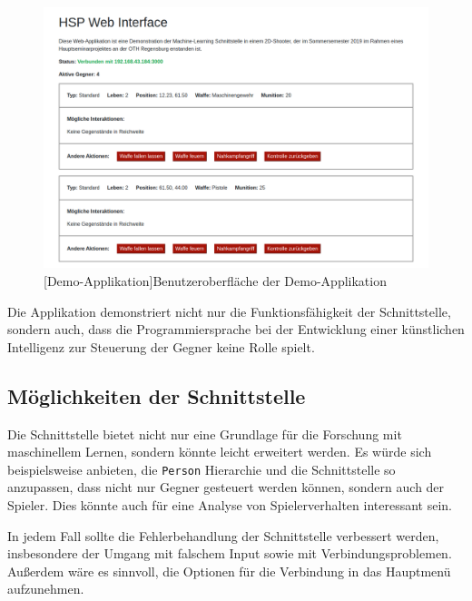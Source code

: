 \begin{figure}[h]
 \centering
 \includegraphics[width=0.835\linewidth]{pics/web-app_connected.png}
 [Demo-Applikation]{Benutzeroberfläche der Demo-Applikation}
	\label{fig:webapp}
\end{figure}

Die Applikation demonstriert nicht nur die Funktionsfähigkeit der Schnittstelle, sondern auch, dass die Programmiersprache bei der Entwicklung einer künstlichen Intelligenz zur Steuerung der Gegner keine Rolle spielt.

\subsection{Möglichkeiten der Schnittstelle}\label{sec:interfacePossibilities}

Die Schnittstelle bietet nicht nur eine Grundlage für die Forschung mit maschinellem Lernen, sondern könnte leicht erweitert werden. Es würde sich beispielsweise anbieten, die \texttt{Person} Hierarchie und die Schnittstelle so anzupassen, dass nicht nur Gegner gesteuert werden können, sondern auch der Spieler. Dies könnte auch für eine Analyse von Spielerverhalten interessant sein.

In jedem Fall sollte die Fehlerbehandlung der Schnittstelle verbessert werden, insbesondere der Umgang mit falschem Input sowie mit Verbindungsproblemen. Außerdem wäre es sinnvoll, die Optionen für die Verbindung in das Hauptmenü aufzunehmen.
